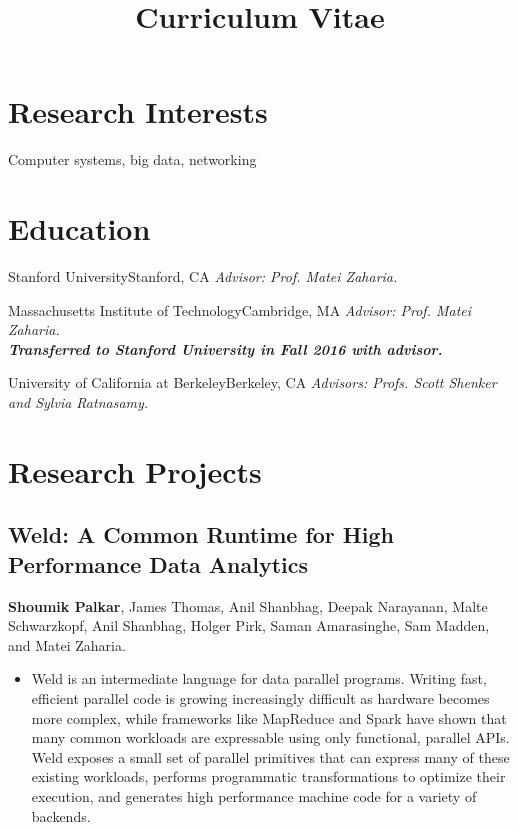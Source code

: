 \documentclass[11pt,letterpaper,sans]{moderncv}
\title{Curriculum Vitae}
\begin{document}
\makecvtitle
\section{Research Interests}
Computer systems, big data, networking

\section{Education}
{Stanford University}{Stanford, CA}{
\emph{Advisor: Prof. Matei Zaharia.}
}{}

{Massachusetts Institute of Technology}{Cambridge, MA}{
\emph{Advisor: Prof. Matei Zaharia.} \\
\textbf{\emph{Transferred to Stanford University in Fall 2016 with advisor.}}
}{}

{University of California at Berkeley}{Berkeley, CA}{
\emph{Advisors: Profs. Scott Shenker and Sylvia Ratnasamy.}
}{}

\section{Research Projects}

\subsection{Weld: A Common Runtime for High Performance Data Analytics}
\cvitem {}
{
    \textbf{Shoumik Palkar}, James Thomas, Anil Shanbhag, Deepak Narayanan, Malte Schwarzkopf, Anil Shanbhag, Holger Pirk, Saman Amarasinghe, Sam Madden, and Matei Zaharia.
    \begin{itemize}
      \item Weld is an intermediate language for data parallel programs. Writing fast, efficient
      parallel code is growing increasingly difficult as hardware becomes more complex,
      while frameworks like MapReduce and Spark have shown that many common workloads are expressable
      using only functional, parallel APIs. Weld exposes a small set of parallel primitives that can
      express many of these existing workloads, performs programmatic transformations to optimize
      their execution, and generates high performance machine code for a variety of backends.
    \end{itemize}
}
\end{document}
